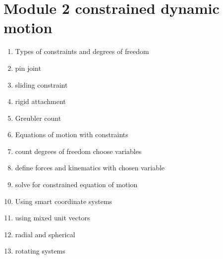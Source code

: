 \documentclass[letterpaper,10pt,english]{sphinxmanual}
\begin{document}
\noindent{}


\chapter{Module 2 \sphinxhyphen{} constrained dynamic motion}
\label{\detokenize{module_02/overview:module-2-constrained-dynamic-motion}}\label{\detokenize{module_02/overview::doc}}
\begin{enumerate}
%
\item {} 
Types of constraints and degrees of freedom

\item {} 
pin joint

\item {} 
sliding constraint

\item {} 
rigid attachment

\item {} 
Greubler count

\item {} 
Equations of motion with constraints

\item {} 
count degrees of freedom choose variables

\item {} 
define forces and kinematics with chosen variable

\item {} 
solve for constrained equation of motion

\item {} 
Using smart coordinate systems

\item {} 
using mixed unit vectors

\item {} 
radial and spherical

\item {} 
rotating systems

\end{enumerate}
\end{document}
